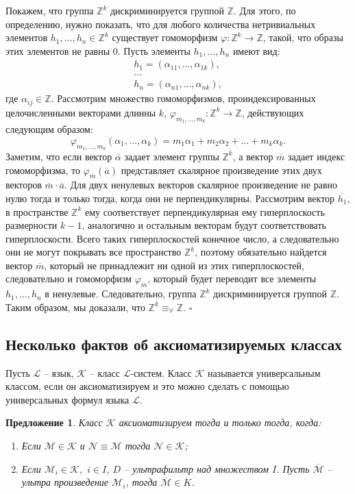 \documentclass[a4paper,11pt,twoside]{article}
\newtheorem{proposition}{Предложение}[section]
\def\K{{\mathcal{K}}}
\def\L{{\mathcal{L}}}
\def\Z{{\mathbb{Z}}}
\begin{document}
Покажем, что группа $\Z^k$ дискриминируется группой $\Z$. Для этого, по определению, нужно показать, что для любого количества нетривиальных элементов $h_1, \ldots, h_n \in \Z^k$ существует гомоморфизм $\varphi : \Z^k \rightarrow \Z$, такой, что образы этих элементов не равны 0. Пусть элементы $h_1, \ldots, h_n$ имеют вид:
$$\begin{array}{c}
 h_1 = (\alpha_{11}, \ldots, \alpha_{1k}), \\
 \ldots \\
 h_n = (\alpha_{n1}, \ldots, \alpha_{nk}),
 \end{array} $$
где $\alpha_{ij} \in \Z$. Рассмотрим множество гомоморфизмов, проиндексированных целочисленными векторами длинны $k$, $\varphi_{m_1,\ldots,m_k} : \Z^k \rightarrow \Z$, действующих следующим образом:
$$\varphi_{m_1,\ldots,m_k} (\alpha_1, \ldots, \alpha_k) = m_1 \alpha_1 + m_2 \alpha_2 + \ldots + m_k \alpha_k.$$
Заметим, что если вектор $\overline{\alpha}$ задает элемент группы $\Z^k$, а вектор $\overline{m}$ задает индекс гомоморфизма, то $\varphi_{\overline{m}}(\overline{a})$ представляет скалярное произведение этих двух векторов $\overline{m} \cdot \overline{a}$. Для двух ненулевых векторов скалярное произведение не равно нулю тогда и только тогда, когда они не перпендикулярны. Рассмотрим вектор $\overline{h_1}$, в пространстве $\Z^k$ ему соответствует перпендикулярная ему гиперплоскость размерности $k-1$, аналогично и остальным векторам будут соответствовать гиперплоскости. Всего таких гиперплоскостей конечное число, а следовательно они не могут покрывать все пространство $\Z^k$, поэтому обязательно найдется вектор $\overline{m}$, который не принадлежит ни одной из этих гиперплоскостей, следовательно и гомоморфизм $\varphi_{\overline{m}}$, который будет переводит все элементы $h_1,\ldots, h_n$ в ненулевые. Следовательно, группа $\Z^k$ дискриминируется группой $\Z$. Таким образом, мы доказали, что $\Z^k \equiv_{\forall} \Z$. $\square$



\subsection{Несколько фактов об аксиоматизируемых классах}

Пусть $\L$ -- язык, $\K$ -- класс $\L$-систем. Класс $\K$ называется универсальным классом, если он аксиоматизируем и это можно сделать с помощью универсальных формул языка $\L$.

\begin{proposition}\label{prop:AxiomClass}
Класс $\K$ аксиоматизируем тогда и только тогда, когда:
\begin{enumerate}
\item Если $\mathcal{M} \in \K$ и $\mathcal{N} \equiv \mathcal{M}$ тогда $\mathcal{N} \in \K$;
\item Если $\mathcal{M}_i \in \K,$ $i \in I$, $D$ -- ультрафильтр над множеством $I$. Пусть $\overline{\mathcal{M}}$ -- ультра произведение $\mathcal{M}_i$, тогда $\overline{\mathcal{M}} \in K$.
\end{enumerate}
\end{proposition}
\end{document}
